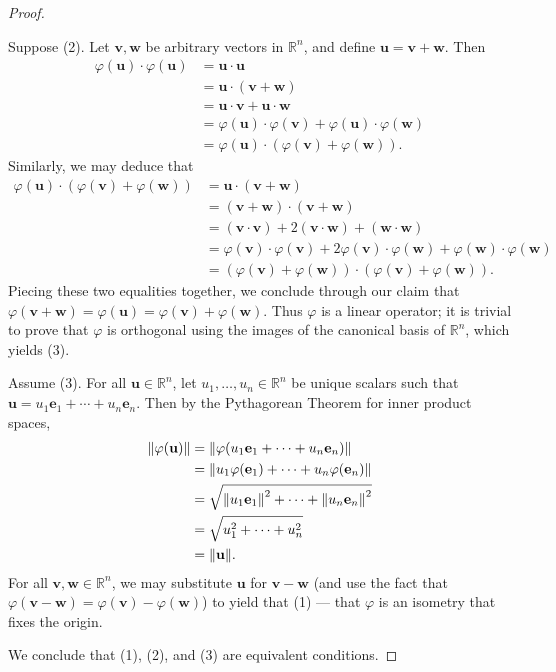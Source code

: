 \documentclass[11pt]{article}
\renewcommand{\vec}[1]{\mathbf{#1}}
\begin{document}
\begin{adjustwidth}{1cm}{}
\begin{proof}
\begin{adjustwidth}{1cm}{}
		\end{adjustwidth}
		Suppose (2). Let $\vec{v}, \vec{w}$ be arbitrary vectors in $\mathbb{R}^{n}$, and define $\vec{u} = \vec{v} + \vec{w}$. Then
		\begin{align*}
			\varphi(\vec{u}) \cdot \varphi(\vec{u}) &= \vec{u} \cdot \vec{u} \\
			&= \vec{u} \cdot (\vec{v} + \vec{w}) \\
			&= \vec{u} \cdot \vec{v} + \vec{u} \cdot \vec{w} \\
			&= \varphi(\vec{u}) \cdot \varphi(\vec{v}) + \varphi(\vec{u}) \cdot \varphi(\vec{w}) \\
			&= \varphi(\vec{u}) \cdot (\varphi(\vec{v}) + \varphi(\vec{w})).
		\end{align*}
		Similarly, we may deduce that
		\begin{align*}
			\varphi(\vec{u}) \cdot (\varphi(\vec{v}) + \varphi(\vec{w})) &= \vec{u} \cdot (\vec{v} + \vec{w}) \\
			&= (\vec{v} + \vec{w}) \cdot (\vec{v} + \vec{w}) \\
			&= (\vec{v} \cdot \vec{v}) + 2 (\vec{v} \cdot \vec{w}) + (\vec{w} \cdot \vec{w}) \\
			&= \varphi(\vec{v}) \cdot \varphi(\vec{v}) + 2 \varphi(\vec{v}) \cdot \varphi(\vec{w}) + \varphi(\vec{w}) \cdot \varphi(\vec{w}) \\
			&= (\varphi(\vec{v}) + \varphi(\vec{w})) \cdot (\varphi(\vec{v}) + \varphi(\vec{w})).
		\end{align*}
		Piecing these two equalities together, we conclude through our claim that $\varphi(\vec{v} + \vec{w}) = \varphi(\vec{u}) = \varphi(\vec{v}) + \varphi(\vec{w})$. Thus $\varphi$ is a linear operator; it is trivial to prove that $\varphi$ is orthogonal using the images of the canonical basis of $\mathbb{R}^{n}$, which yields (3).

		Assume (3). For all $\vec{u} \in \mathbb{R}^{n}$, let $u_{1}, \ldots, u_{n} \in \mathbb{R}^{n}$ be unique scalars such that $\vec{u} = u_{1} \vec{e}_{1} + \cdots + u_{n} \vec{e}_{n}$. Then by the Pythagorean Theorem for inner product spaces,
		\begin{align*}
			\norm{\varphi(\vec{u})} &= \norm{\varphi(u_{1} \vec{e}_{1} + \cdots + u_{n} \vec{e}_{n})} \\
			&= \norm{u_{1} \varphi(\vec{e}_{1}) + \cdots + u_{n} \varphi(\vec{e}_{n})} \\
			&= \sqrt{\norm{u_{1} \vec{e}_{1}}^{2} + \cdots + \norm{u_{n} \vec{e}_{n}}^{2}} \\
			&= \sqrt{u_{1}^{2} + \cdots + u_{n}^{2}} \\
			&= \norm{\vec{u}}.
		\end{align*}
		For all $\vec{v}, \vec{w} \in \mathbb{R}^{n}$, we may substitute $\vec{u}$ for $\vec{v} - \vec{w}$ (and use the fact that $\varphi(\vec{v} - \vec{w}) = \varphi(\vec{v}) - \varphi(\vec{w})$) to yield that (1) --- that $\varphi$ is an isometry that fixes the origin.

		We conclude that (1), (2), and (3) are equivalent conditions.
	\end{proof}
\end{adjustwidth}
\end{document}
